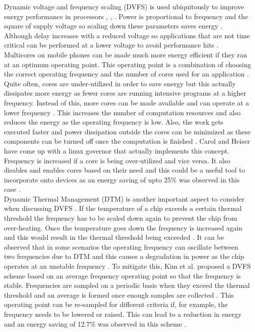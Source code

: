 \documentclass[journal]{IEEEtran}
\begin{document}
Dynamic voltage and frequency scaling (DVFS) is used ubiquitously to improve energy performance in processors \cite{LinuxGov}, \cite{TempDVFS}, \cite{48Core}. Power is proportional to frequency and the square of supply voltage so scaling down these parameters saves energy \cite{TempDVFS}. Although delay increases with a reduced voltage so applications that are not time critical can be performed at a lower voltage to avoid performance hits \cite{LinuxGov}. Multicores on mobile phones can be made much more energy efficient if they ran at an optimum operating point. This operating point is a combination of choosing the correct operating frequency and the number of cores used for an application \cite{LinuxGov}. Quite often, cores are under-utilized in order to save energy but this actually dissipates more energy as fewer cores are running intensive programs at a higher frequency. Instead of this, more cores can be made available and can operate at a lower frequency \cite{LinuxGov}. This increases the number of computation resources and also reduces the energy as the operating frequency is low. Also, the work gets executed faster and power dissipation outside the cores can be minimized as these components can be turned off once the computation is finished \cite{LinuxGov}. Carol and Heiser \cite{LinuxGov} have come up with a linux governor that actually implements this concept. Frequency is increased if a core is being over-utilized and vice versa. It also disables and enables cores based on their need and this could be a useful tool to incorporate onto devices as an energy saving of upto 25\% was observed in this case \cite{LinuxGov}.\\

Dynamic Thermal Management (DTM) is another important aspect to consider when discussing DVFS \cite{TempDVFS}. If the temperature of a chip exceeds a certain thermal threshold the frequency has to be scaled down again to prevent the chip from over-heating. Once the temperature goes down the frequency is increased again and this would result in the thermal threshold being exceeded \cite{TempDVFS}. It can be observed that in some scenarios the operating frequency can oscillate between two frequencies due to DTM and this causes a degradation in power as the chip operates at an unstable frequency \cite{TempDVFS}. To mitigate this, Kim et al. \cite{TempDVFS} proposed a DVFS scheme based on an average frequency operating point so that the frequency is stable. Frequencies are sampled on a periodic basis when they exceed the thermal threshold and an average is formed once enough samples are collected \cite{TempDVFS}. This operating point can be re-sampled for different criteria if, for example, the frequency needs to be lowered or raised. This can lead to a reduction in energy and an energy saving of 12.7\% was observed in this scheme \cite{TempDVFS}.
\end{document}
